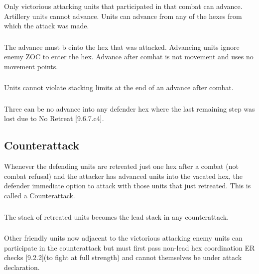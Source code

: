 \subsubsection{}
Only victorious attacking units that participated in that combat can advance. Artillery units cannot advance. Units can advance from any of the hexes from which the attack was made.

\subsubsection{}
The advance must b einto the hex that was attacked. Advancing units ignore enemy ZOC to enter the hex. Advance after combat is not movement and uses no movement points.

\subsubsection{}
Units cannot violate stacking limits at the end of an advance after combat.

\subsubsection{}
Three can be no advance into any defender hex where the last remaining step was lost due to No Retreat [9.6.7.c4].

\subsection{Counterattack}

Whenever the defending units are retreated just one hex after a combat (not combat refusal) and the attacker has advanced units into the vacated hex, the defender immediate option to attack with those units that just retreated. This is called a Counterattack.

\subsubsection{}The stack of retreated units becomes the lead stack in any counterattack.

\subsubsection{}
Other friendly units now adjacent to the victorious attacking enemy units can participate in the counterattack but must first pass non-lead hex coordination ER checks [9.2.2](to fight at full strength) and cannot themselves be under attack declaration.

